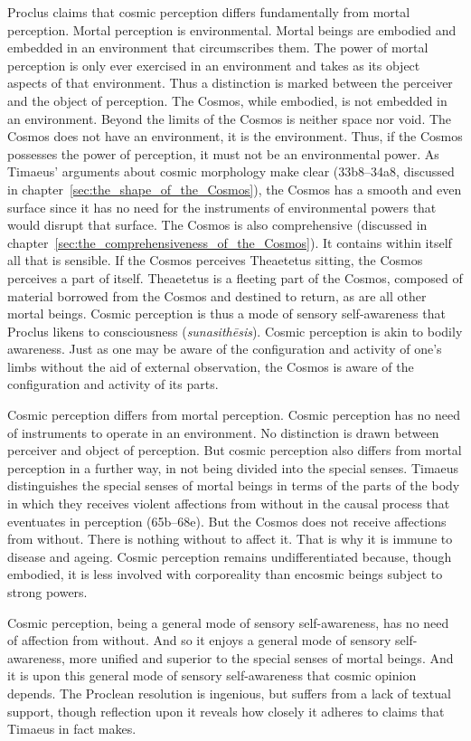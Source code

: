Proclus claims that cosmic perception differs fundamentally from mortal perception. Mortal perception is environmental. Mortal beings are embodied and embedded in an environment that circumscribes them. The power of mortal perception is only ever exercised in an environment and takes as its object aspects of that environment. Thus a distinction is marked between the perceiver and the object of perception. The Cosmos, while embodied, is not embedded in an environment. Beyond the limits of the Cosmos is neither space nor void. The Cosmos does not have an environment, it is the environment. Thus, if the Cosmos possesses the power of perception, it must not be an environmental power. As Timaeus' arguments about cosmic morphology make clear (33b8–34a8, discussed in chapter~\ref{sec:the_shape_of_the_Cosmos}), the Cosmos has a smooth and even surface since it has no need for the instruments of environmental powers that would disrupt that surface. The Cosmos is also comprehensive (discussed in chapter~\ref{sec:the_comprehensiveness_of_the_Cosmos}). It contains within itself all that is sensible. If the Cosmos perceives Theaetetus sitting, the Cosmos perceives a part of itself. Theaetetus is a fleeting part of the Cosmos, composed of material borrowed from the Cosmos and destined to return, as are all other mortal beings. Cosmic perception is thus a mode of sensory self-awareness that Proclus likens to consciousness (\emph{sunasithēsis}). Cosmic perception is akin to bodily awareness. Just as one may be aware of the configuration and activity of one's limbs without the aid of external observation, the Cosmos is aware of the configuration and activity of its parts. 

Cosmic perception differs from mortal perception. Cosmic perception has no need of instruments to operate in an environment. No distinction is drawn between perceiver and object of perception. But cosmic perception also differs from mortal perception in a further way, in not being divided into the special senses. Timaeus distinguishes the special senses of mortal beings in terms of the parts of the body in which they receives violent affections from without in the causal process that eventuates in perception (65b–68e). But the Cosmos does not receive affections from without. There is nothing without to affect it. That is why it is immune to disease and ageing. Cosmic perception remains undifferentiated because, though embodied, it is less involved with corporeality than encosmic beings subject to strong powers. 

Cosmic perception, being a general mode of sensory self-awareness, has no need of affection from without. And so it enjoys a general mode of sensory self-awareness, more unified and superior to the special senses of mortal beings. And it is upon this general mode of sensory self-awareness that cosmic opinion depends. The Proclean resolution is ingenious, but suffers from a lack of textual support, though reflection upon it reveals how closely it adheres to claims that Timaeus in fact makes.

